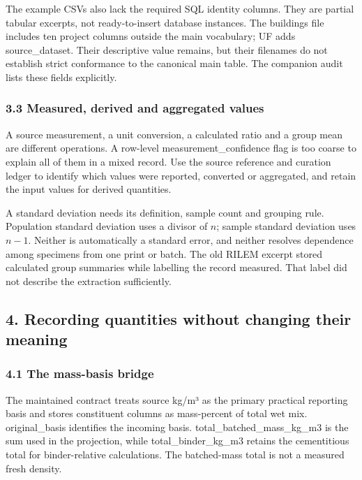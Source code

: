 \documentclass[
  american,
  11pt,
  letterpaper,
]{article}
\renewcommand{\texttt}[1]{{\ttfamily\fontsize{9.5}{11}\selectfont\hyphenchar\font=-1 #1}}
\begin{document}
The example CSVs also lack the required SQL identity columns. They are
partial tabular excerpts, not ready-to-insert database instances. The
buildings file includes ten project columns outside the main vocabulary;
UF adds \texttt{source\_dataset}. Their descriptive value remains, but
their filenames do not establish strict conformance to the canonical
main table. The companion audit lists these fields explicitly.

\subsubsection{3.3 Measured, derived and aggregated
values}\label{measured-derived-and-aggregated-values}

A source measurement, a unit conversion, a calculated ratio and a group
mean are different operations. A row-level
\texttt{measurement\_confidence} flag is too coarse to explain all of
them in a mixed record. Use the source reference and curation ledger to
identify which values were reported, converted or aggregated, and retain
the input values for derived quantities.

A standard deviation needs its definition, sample count and grouping
rule. Population standard deviation uses a divisor of \(n\); sample
standard deviation uses \(n-1\). Neither is automatically a standard
error, and neither resolves dependence among specimens from one print or
batch. The old RILEM excerpt stored calculated group summaries while
labelling the record measured. That label did not describe the
extraction sufficiently.

\subsection{4. Recording quantities without changing their
meaning}\label{recording-quantities-without-changing-their-meaning}

\subsubsection{4.1 The mass-basis bridge}\label{the-mass-basis-bridge}

The maintained contract treats source kg/m³ as the primary practical
reporting basis and stores constituent columns as mass-percent of total
wet mix. \texttt{original\_basis} identifies the incoming basis.
\texttt{total\_batched\_mass\_kg\_m3} is the sum used in the projection,
while \texttt{total\_binder\_kg\_m3} retains the cementitious total for
binder-relative calculations. The batched-mass total is not a measured
fresh density.
\end{document}
